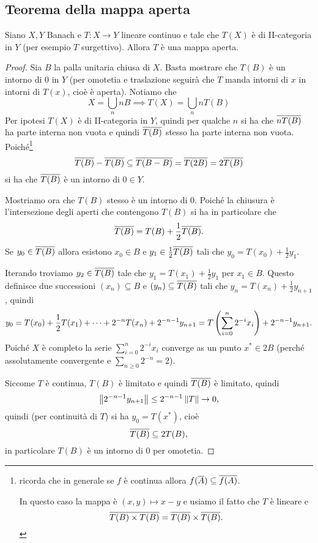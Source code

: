 \subsection{Teorema della mappa aperta}
\begin{theorem}\label{ThMappaAperta}
Siano $X,Y$ Banach e $T:X\to Y$ lineare continuo e tale che $T(X)$ \`e di II-categoria in $Y$ (per esempio $T$ surgettivo). Allora $T$ \`e una mappa aperta.
\end{theorem}
\begin{proof}
Sia $B$ la palla unitaria chiusa di $X$. Basta mostrare che $T(B)$ \`e un intorno di $0$ in $Y$ (per omotetia e traslazione seguir\`a che $T$ manda intorni di $x$ in intorni di $T(x)$, cio\`e \`e aperta). Notiamo che 
\[X=\bigcup_n nB\implies T(X)=\bigcup_n nT(B)\]
Per ipotesi $T(X)$ \`e di II-categoria in $Y$, quindi per qualche $n$ si ha che $\overline{n T(B)}$ ha parte interna non vuota e quindi $\overline{T(B)}$ stesso ha parte interna non vuota. Poich\'e\footnote{ricorda che in generale se $f$ \`e continua allora $f(\overline{A})\subseteq \overline{f(A)}$. 

In questo caso la mappa \`e $(x,y)\mapsto x-y$ e usiamo il fatto che $T$ \`e lineare e \[\overline{T(B)\times T(B)}=\overline{T(B)}\times \overline{T(B)}.\]} 
\[\overline{T(B)}-\overline{T(B)}\subseteq \overline{T(B-B)}=\overline{T(2B)}=2\overline{T(B)}\]
si ha che $\overline{T(B)}$ \`e un intorno di $0\in Y$.


Mostriamo ora che $T(B)$ stesso \`e un intorno di $0$. Poich\'e la chiusura \`e l'intersezione degli aperti che contengono $T(B)$ si ha in particolare che
\[\overline{T(B)}=T(B)+\frac12\overline{T(B)}.\]
Se $y_0\in\overline{T(B)}$ allora esistono $x_0\in B$ e $y_1\in \frac12\overline{T(B)}$ tali che $y_0=T(x_0)+\frac12 y_1$.

Iterando troviamo $y_2\in \overline{T(B)}$ tale che $y_1=T(x_1)+\frac12 y_1$ per $x_1\in B$. Questo definisce due successioni $(x_n)\subseteq B$ e $(y_n)\subseteq \overline{T(B)}$ tali che $y_n=T(x_n)+\frac12 y_{n+1}$, quindi
\[y_0=T(x_0)+\frac12 T(x_1)+\cdots+2^{-n}T(x_n)+2^{-n-1}y_{n+1}=T\left({\sum_{i=0}^n2^{-i}x_i}\right)+2^{-n-1}y_{n+1}.\]
Poich\'e $X$ \`e completo la serie $\sum_{i=0}^n2^{-i}x_i$ converge as un punto $x^\ast\in 2B$ (perch\'e assolutamente convergente e $\sum_{n\geq 0} 2^{-n}=2$). 

Siccome $T$ \`e continua, $T(B)$ \`e limitato e quindi $\overline{T(B)}$ \`e limitato, quindi 
\[\left\Vert{2^{-n-1}y_{n+1}}\right\Vert\leq 2^{-n-1}\left\Vert{T}\right\Vert\to 0,\]
quindi (per continuit\`a di $T$) si ha $y_0=T(x^\ast)$, cio\`e
\[\overline{T(B)}\subseteq 2T(B),\]
in particolare $T(B)$ \`e un intorno di $0$ per omotetia.
\end{proof}

